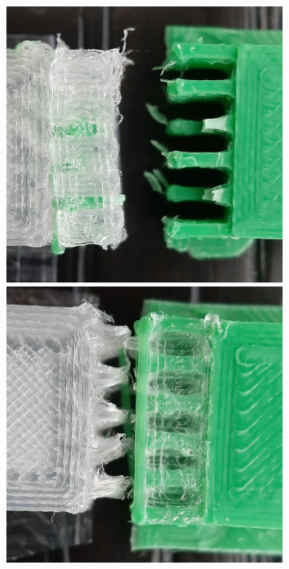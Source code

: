 \begin{figure}
\begin{subfigure}[B]{.29\columnwidth}
		\includegraphics[width=\figwidth]{sources/testing/j2_cropped.jpg}
		\includegraphics[width=\figwidth]{sources/testing/j4_cropped.jpg}

\end{subfigure}
\end{figure}
